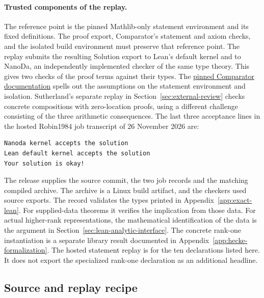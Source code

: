 \documentclass[11pt]{amsart}
\theoremstyle{definition}
\theoremstyle{remark}
\numberwithin{equation}{section}
\begin{document}
\paragraph{Trusted components of the replay.}
The reference point is the pinned Mathlib-only statement
environment and its fixed definitions. The proof export,
Comparator's statement and axiom checks, and the isolated
build environment must preserve that reference point.
The replay submits the resulting Solution export to Lean's
default kernel and to NanoDa, an independently implemented
checker of the same type theory. This gives two checks of the
proof terms against their types. The
\href{https://raw.githubusercontent.com/leanprover/comparator/68a064109f01c08f47c8edc9f51d6a2bbffaa188/README.md}
{pinned Comparator documentation} spells out the assumptions
on the statement environment and isolation. Sutherland's
separate replay in Section~\ref{sec:external-review}
checks concrete compositions with zero-location proofs,
using a different challenge consisting of the three
arithmetic consequences. The last three acceptance lines
in the hosted Robin1984 job transcript of
26 November 2026 are:
\begin{verbatim}
Nanoda kernel accepts the solution
Lean default kernel accepts the solution
Your solution is okay!
\end{verbatim}
The release supplies the source commit, the two job records and
the matching compiled archive. The archive is a Linux build
artifact, and the checkers used source exports. The record
validates the types printed in Appendix~\ref{app:exact-lean}.
For supplied-data theorems it verifies the implication from those
data. For actual higher-rank representations, the mathematical
identification of the data is the argument in
Section~\ref{sec:lean-analytic-interface}. The concrete rank-one
instantiation is a separate library result documented in
Appendix~\ref{app:hecke-formalization}. The hosted statement
replay is for the ten declarations listed here. It does not
export the specialized rank-one declaration as an additional
headline.

\subsection{Source and replay recipe}
\end{document}
